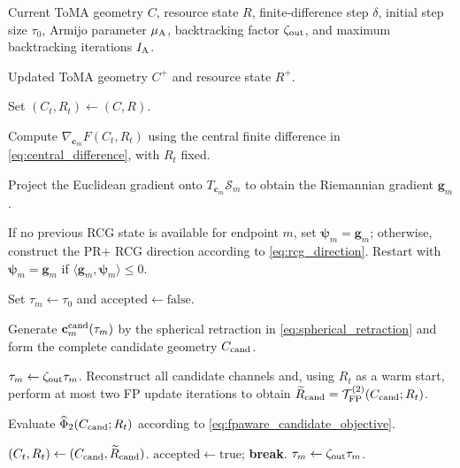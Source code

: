 \documentclass[letterpaper,journal]{IEEEtran}
\begin{document}
\begin{algorithm}[t]
\caption{FP-Aware RCG-Based ToMA Position Optimization}
\label{alg:fpaware_rcg}
\begin{algorithmic}[1]

\REQUIRE Current ToMA geometry $C$, resource state $R$,
finite-difference step $\delta$, initial step size $\tau_0$,
Armijo parameter $\mu_{\rm A}$, backtracking factor
$\zeta_{\rm out}$, and maximum backtracking iterations $I_{\rm A}$.

\ENSURE Updated ToMA geometry $C^{+}$ and resource state $R^{+}$.

\STATE Set $(C_t,R_t)\leftarrow(C,R)$.


    \STATE Compute $\nabla_{\mathbf c_m}F(C_t,R_t)$ using the
    central finite difference in \eqref{eq:central_difference},
    with $R_t$ fixed.

    \STATE Project the Euclidean gradient onto
    $T_{\mathbf c_m}\mathcal S_m$ to obtain the
    Riemannian gradient $\mathbf g_m$.

    \STATE If no previous RCG state is available for endpoint $m$,
    set $\boldsymbol\psi_m=\mathbf g_m$; otherwise, construct the
    PR+ RCG direction according to \eqref{eq:rcg_direction}.
    Restart with $\boldsymbol\psi_m=\mathbf g_m$ if
    $\langle\mathbf g_m,\boldsymbol\psi_m\rangle\le0$.

    \STATE Set $\tau_m\leftarrow\tau_0$ and
    $\mathrm{accepted}\leftarrow\mathrm{false}$.


        \STATE Generate $\mathbf c_m^{\rm cand}(\tau_m)$ by the
        spherical retraction in \eqref{eq:spherical_retraction}
        and form the complete candidate geometry $C_{\rm cand}$.

            \STATE $\tau_m\leftarrow\zeta_{\rm out}\tau_m$.
        \ELSE
            \STATE Reconstruct all candidate channels and, using
            $R_t$ as a warm start, perform at most two FP update
            iterations to obtain
            $\widetilde R_{\rm cand}
            =\mathcal T_{\rm FP}^{(2)}(C_{\rm cand};R_t)$.

            \STATE Evaluate
            $\widehat\Phi_2(C_{\rm cand};R_t)$ according to
            \eqref{eq:fpaware_candidate_objective}.

                \STATE $(C_t,R_t)\leftarrow
                (C_{\rm cand},\widetilde R_{\rm cand})$.
                \STATE $\mathrm{accepted}\leftarrow\mathrm{true}$;
                \STATE \textbf{break}.
            \ELSE
                \STATE $\tau_m\leftarrow\zeta_{\rm out}\tau_m$.
            \ENDIF
        \ENDIF


\end{algorithmic}
\end{algorithm}
\end{document}

